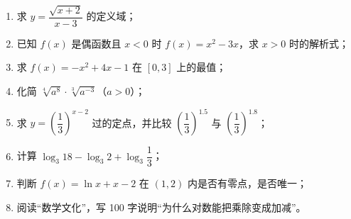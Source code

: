 \begin{homework}
\begin{enumerate}
  \item 求 $y=\dfrac{\sqrt{x+2}}{x-3}$ 的定义域；
  \item 已知 $f(x)$ 是偶函数且 $x<0$ 时 $f(x)=x^2-3x$，求 $x>0$ 时的解析式；
  \item 求 $f(x)=-x^2+4x-1$ 在 $[0,3]$ 上的最值；
  \item 化简 $\sqrt[4]{a^8}\cdot\sqrt[3]{a^{-3}}$（$a>0$）；
  \item 求 $y=\left(\dfrac13\right)^{x-2}$ 过的定点，并比较 $\left(\dfrac13\right)^{1.5}$ 与 $\left(\dfrac13\right)^{1.8}$；
  \item 计算 $\log_3 18-\log_3 2+\log_3\dfrac13$；
  \item 判断 $f(x)=\ln x+x-2$ 在 $(1,2)$ 内是否有零点，是否唯一；
  \item 阅读“数学文化”，写 100 字说明“为什么对数能把乘除变成加减”。
\end{enumerate}
\end{homework}
